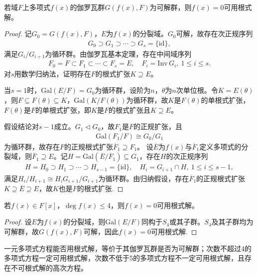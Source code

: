 \documentclass[../../main.tex]{subfiles}%
\begin{document}
\begin{theorem}
若域$F$上多项式$f(x)$的伽罗瓦群$G(f(x),F)$为可解群，则$f(x)=0$可用根式解。
\end{theorem}
\begin{proof}
记$G_0=G(f(x),F)$，$E$为$f(x)$的分裂域。$G_0$可解，故存在次正规序列
\begin{align*}
G_0\supset G_1\supset\cdots\supset G_s=\{\mathrm{id}\},
\end{align*}
满足$G_i/G_{i+1}$为循环群。由伽罗瓦基本定理，存在中间域序列
\begin{align*}
F_0=F\subset F_1\subset\cdots\subset F_s=E,\quad F_i=\mathrm{Inv}\,G_i,\ 1\leqslant i\leqslant s.
\end{align*}
对$s$用数学归纳法，证明存在$F$的根式扩张$K\supseteq E$。

当$s=1$时，$\mathrm{Gal}(E/F)=G_0$为循环群，设阶为$n$，$\theta$为$n$次单位根。令$K=E(\theta)$，则$F\subseteq F(\theta)\subseteq K$，$\mathrm{Gal}(K/F(\theta))$为循环群，故$K$是$F(\theta)$的单根式扩张，$F(\theta)$是$F$的单根式扩张，即$K$是$F$的根式扩张且$K\supseteq E$。

假设结论对$s-1$成立。$G_1\triangleleft G_0$，故$F_1$是$F$的正规扩张，且
\begin{align*}
\mathrm{Gal}(F_1/F)\cong G_0/G_1
\end{align*}
为循环群，故存在$F$的正规根式扩张$\overline{F}_1\supseteq F_1$。
设$\overline{E}$为$f(x)$与$\overline{F}_1$定义多项式的分裂域，则$\overline{F}_1\supseteq E$。记$H=\mathrm{Gal}(\overline{E}/\overline{F}_1)\subseteq G_1$，存在$H$的次正规序列
\begin{align*}
H=H_0\supset H_1\supset\cdots\supset H_{s-1}=\{\mathrm{id}\},\quad H_i=G_{i+1}\cap H,\ 1\leqslant i\leqslant s-1,
\end{align*}
满足$H_i/H_{i+1}\cong H_iG_{i+1}/G_{i+1}$为循环群。由归纳假设，存在$\overline{F}_1$的正规根式扩张$K\supseteq\overline{E}\supseteq E$，故$K$也是$F$的根式扩张.
\end{proof}

\begin{corollary}
若$f(x)\in F[x]$，$\deg f(x)\leqslant4$，则$f(x)=0$可用根式解。
\end{corollary}
\begin{proof}
设$E$为$f(x)$的分裂域，则$\mathrm{Gal}(E/F)$同构于$S_4$或其子群。$S_4$及其子群均为可解群，故$G(f(x),F)$可解，因此$f(x)=0$可用根式解.
\end{proof}

\begin{remark}
一元多项式方程能否用根式解，等价于其伽罗瓦群是否为可解群；次数不超过4的多项式方程一定可用根式解，次数不低于5的多项式方程不一定可用根式解，且存在不可根式解的高次方程。
\end{remark}
\end{document}
